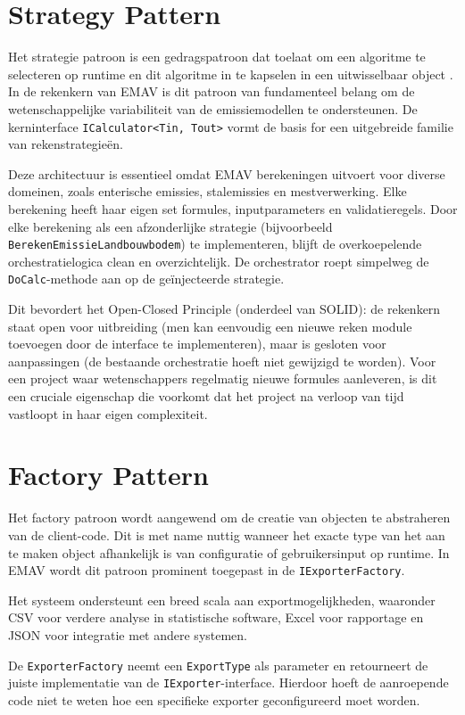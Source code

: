 \section{Strategy Pattern}
Het strategie patroon is een gedragspatroon dat toelaat om een algoritme te selecteren op runtime en dit algoritme in te kapselen in een uitwisselbaar object \autocite{gof1994}. 
In de rekenkern van EMAV is dit patroon van fundamenteel belang om de wetenschappelijke variabiliteit van de emissiemodellen te ondersteunen. 
De kerninterface \texttt{ICalculator<Tin, Tout>} vormt de basis for een uitgebreide familie van rekenstrategieën.

Deze architectuur is essentieel omdat EMAV berekeningen uitvoert voor diverse domeinen, zoals enterische emissies, stalemissies en mestverwerking. 
Elke berekening heeft haar eigen set formules, inputparameters en validatieregels. 
Door elke berekening als een afzonderlijke strategie (bijvoorbeeld \texttt{BerekenEmissieLandbouwbodem}) te implementeren, blijft de overkoepelende orchestratielogica clean en overzichtelijk. 
De orchestrator roept simpelweg de \texttt{DoCalc}-methode aan op de geïnjecteerde strategie.

Dit bevordert het Open-Closed Principle (onderdeel van SOLID): de rekenkern staat open voor uitbreiding (men kan eenvoudig een nieuwe reken module toevoegen door de interface te implementeren), maar is gesloten voor aanpassingen (de bestaande orchestratie hoeft niet gewijzigd te worden). 
Voor een project waar wetenschappers regelmatig nieuwe formules aanleveren, is dit een cruciale eigenschap die voorkomt dat het project na verloop van tijd vastloopt in haar eigen complexiteit.

\section{Factory Pattern}
Het factory patroon wordt aangewend om de creatie van objecten te abstraheren van de client-code. 
Dit is met name nuttig wanneer het exacte type van het aan te maken object afhankelijk is van configuratie of gebruikersinput op runtime. 
In EMAV wordt dit patroon prominent toegepast in de \texttt{IExporterFactory}.

Het systeem ondersteunt een breed scala aan exportmogelijkheden, waaronder CSV voor verdere analyse in statistische software, Excel voor rapportage en JSON voor integratie met andere systemen. {\sloppy De \texttt{ExporterFactory} neemt een \texttt{ExportType} als parameter en retourneert de juiste implementatie van de \texttt{IExporter}-interface. Hierdoor hoeft de aanroepende code niet te weten hoe een specifieke exporter geconfigureerd moet worden.\par}

